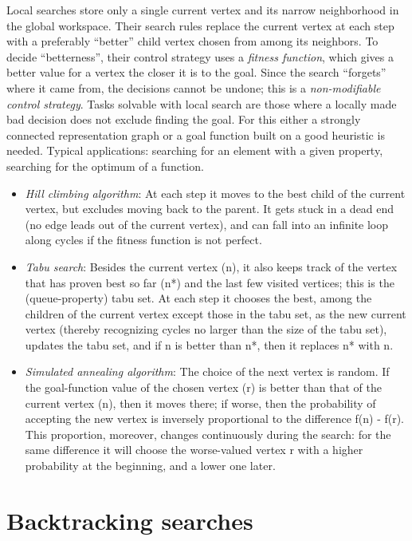 \documentclass[margin=0px]{article}
\begin{document}
Local searches store only a single current vertex and its narrow neighborhood in the global workspace. Their search rules replace the current vertex at each step with a preferably ``better'' child vertex chosen from among its neighbors. To decide ``betterness'', their control strategy uses a \textit{fitness function}, which gives a better value for a vertex the closer it is to the goal. Since the search ``forgets'' where it came from, the decisions cannot be undone; this is a \textit{non-modifiable control strategy}.
Tasks solvable with local search are those where a locally made bad decision does not exclude finding the goal. For this either a strongly connected representation graph or a goal function built on a good heuristic is needed. Typical applications: searching for an element with a given property, searching for the optimum of a function.
\begin{itemize}
    \item \textit{Hill climbing algorithm}: At each step it moves to the best child of the current vertex, but excludes moving back to the parent. It gets stuck in a dead end (no edge leads out of the current vertex), and can fall into an infinite loop along cycles if the fitness function is not perfect.
    \item \textit{Tabu search}: Besides the current vertex (n), it also keeps track of the vertex that has proven best so far (n*) and the last few visited vertices; this is the (queue-property) tabu set. At each step it chooses the best, among the children of the current vertex except those in the tabu set, as the new current vertex (thereby recognizing cycles no larger than the size of the tabu set), updates the tabu set, and if n is better than n*, then it replaces n* with n.
    \item \textit{Simulated annealing algorithm}: The choice of the next vertex is random. If the goal-function value of the chosen vertex (r) is better than that of the current vertex (n), then it moves there; if worse, then the probability of accepting the new vertex is inversely proportional to the difference f(n) - f(r). This proportion, moreover, changes continuously during the search: for the same difference it will choose the worse-valued vertex r with a higher probability at the beginning, and a lower one later.
\end{itemize}

\section{Backtracking searches}
\end{document}
